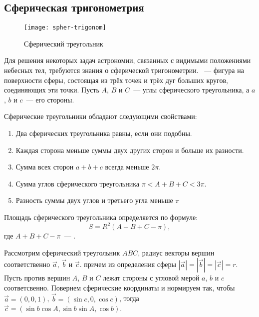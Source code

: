 \subsection{Сферическая тригонометрия}
\label{sec:spher-trig}
\begin{wrapfigure}[10]{r}{.3\tw}
	\centering
	\vspace{-1pc}
 	\texttt{[image: spher-trigonom]}
 	\caption{Сферический треугольник}
\end{wrapfigure}
Для решения некоторых задач астрономии, связанных с видимыми положениями небесных тел, требуются знания о сферической тригонометрии. ~--- фигура на поверхности сферы, состоящая из трёх точек и трёх дуг больших кругов, соединяющих эти точки. Пусть $A$, $B$ и $C$~--- углы сферического треугольника, а $a$, $b$ и $c$~--- его стороны.

Сферические треугольники обладают следующими свойствами:
\begin{enumerate}
\item Два сферических треугольника равны, если они подобны.
\item Каждая сторона меньше суммы двух других сторон и больше их разности.
\item Сумма всех сторон $a+b+c$ всегда меньше $2\pi$.
\item Сумма углов сферического треугольника $\pi < A + B + C < 3\pi$.
\item Разность суммы двух углов и третьего угла меньше $\pi$
\end{enumerate}

Площадь сферического треугольника определяется по формуле:
\begin{equation}
	S = R^2( A + B + C - \pi),
\end{equation}
где $A + B + C - \pi$~--- .

Рассмотрим сферический треугольник $ABC$, радиус векторы вершин соответственно $\vec{a}$, $\vec{b}$ и $\vec{c}$. причем из определения сферы $|\vec{a}| = |\vec{b}| = |\vec{c}| = r$. Пусть против вершин $A$, $B$ и $C$ лежат стороны с угловой мерой $a$, $b$ и $c$ соответсвенно. Повернем сферические координаты и нормируем так, чтобы $\vec{a} = (0, 0, 1)$, $\vec{b} = (\sin c, 0, \cos c)$, тогда $ \vec{c} = (\sin b \cos A, \sin b \sin A, \cos b)$.
	
